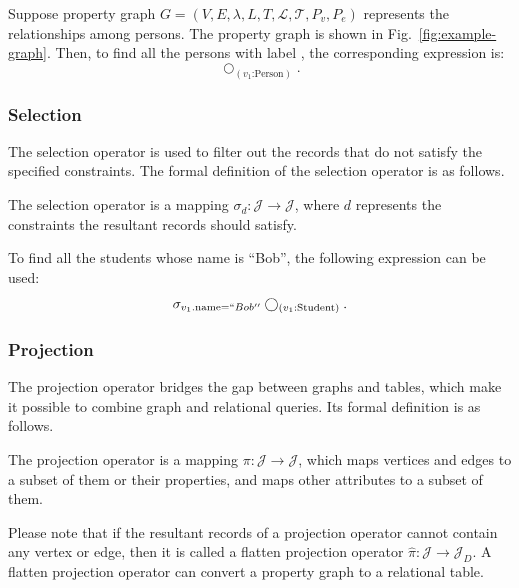 \begin{example}
    Suppose property graph $G = (V, E, \lambda, L, T, \mathcal{L}, \mathcal{T}, P_v, P_e)$ represents the relationships among persons.
    The property graph is shown in Fig.~\ref{fig:example-graph}.
    Then, to find all the persons with label , the corresponding expression is:
    \begin{equation*}
        \bigcirc_{(v_1\text{:Person})}.
    \end{equation*}
\end{example}


\subsubsection{Selection}

The selection operator is used to filter out the records that do not satisfy the specified constraints.
The formal definition of the selection operator is as follows.

\begin{definition}
    The selection operator is a mapping $\sigma_d : \mathcal{J} \rightarrow \mathcal{J}$, where $d$ represents the constraints the resultant records should satisfy.
\end{definition}

\begin{example}
    To find all the students whose name is ``Bob'', the following expression can be used:
    \begin{equation*}
        \sigma_{v_1.\text{name} = ``Bob''}\bigcirc_{(v_1\text{:Student})}.
    \end{equation*}
\end{example}

\subsubsection{Projection}
The projection operator bridges the gap between graphs and tables, which make it possible to combine graph and relational queries.
Its formal definition is as follows.

\begin{definition}
    The projection operator is a mapping $\pi : \mathcal{J} \rightarrow \mathcal{J}$, which maps vertices and edges to a subset of them or their properties, and maps other attributes to a subset of them.
\end{definition}

Please note that if the resultant records of a projection operator cannot contain any vertex or edge, then it is called a flatten projection operator $\hat{\pi} : \mathcal{J} \rightarrow \mathcal{J}_D$.
A flatten projection operator can convert a property graph to a relational table.


